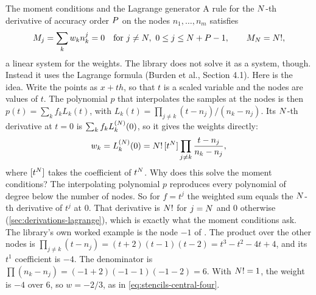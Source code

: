 \begin{figure}[t]
\centering

\end{figure}

\begin{sidebar}[label=sb:moments]{The moment conditions and the Lagrange generator}
A rule for the $N$-th derivative of accuracy order $P$ on the nodes $n_1, \ldots, n_m$ satisfies
\[
  M_{j} = \sum_k w_k n_k^j = 0 \quad \text{for } j \ne N,\ 0 \le j \le N + P - 1,
  \qquad M_{N} = N!,
\]
a linear system for the weights. The library does not solve it as a system, though. Instead it uses the Lagrange
formula (Burden et al.,\cite{burden2016} Section 4.1). Here is the idea. Write the points as $x + t h$, so that $t$ is
a scaled variable and the nodes are values of $t$. The polynomial $p$ that interpolates the samples at the nodes is
then $p(t) = \sum_k f_k L_k(t)$, with $L_k(t) = \prod_{j \ne k} (t - n_j) / (n_k - n_j)$. Its $N$-th derivative
at $t = 0$ is $\sum_k f_k L_k^{(N)}(0)$, so it gives the weights directly:
\[
  w_k = L_k^{(N)}(0) = N!\,[t^{N}] \prod_{j \ne k} \frac{t - n_j}{n_k - n_j},
\]
where $[t^{N}]$ takes the coefficient of $t^{N}$. Why does this solve the moment conditions? The
interpolating polynomial $p$ reproduces every polynomial of degree below the number of nodes. So for $f = t^j$ the
weighted sum equals the $N$-th derivative of $t^j$ at 0. That derivative is $N!$ for $j = N$ and 0
otherwise (\cref{sec:derivations-lagrange}), which is exactly what the moment conditions ask. The library's own
worked example is the node $-1$ of . The product over the other nodes is
$\prod_{j \ne k} (t - n_j) = (t + 2)(t - 1)(t - 2) = t^3 - t^2 - 4t + 4$, and its $t^1$ coefficient is $-4$. The
denominator is $\prod (n_k - n_j) = (-1 + 2)(-1 - 1)(-1 - 2) = 6$. With $N! = 1$, the weight is $-4$ over 6,
so $w = -2/3$, as in \cref{eq:stencils-central-four}.


\end{sidebar}
